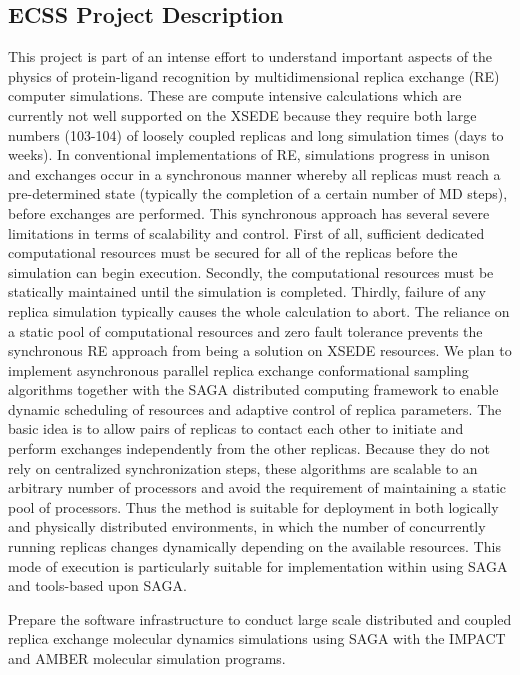\documentclass{sig-alternate}
\begin{document}
\subsection{ECSS Project Description}
 This project is
part of an intense eﬀort to understand important aspects of the
physics of protein-ligand recognition by multidimensional replica
exchange (RE) computer simulations. These are compute intensive
calculations which are currently not well supported on the XSEDE
because they require both large numbers (103-104) of loosely coupled
replicas and long simulation times (days to weeks). In conventional
implementations of RE, simulations progress in unison and exchanges
occur in a synchronous manner whereby all replicas must reach a
pre-determined state (typically the completion of a certain number of
MD steps), before exchanges are performed. This synchronous approach
has several severe limitations in terms of scalability and
control. First of all, suﬃcient dedicated computational resources must
be secured for all of the replicas before the simulation can begin
execution. Secondly, the computational resources must be statically
maintained until the simulation is completed. Thirdly, failure of any
replica simulation typically causes the whole calculation to abort.
The reliance on a static pool of computational resources and zero
fault tolerance prevents the synchronous RE approach from being a
solution on XSEDE resources. We plan to implement asynchronous
parallel replica exchange conformational sampling algorithms together
with the SAGA distributed computing framework to enable dynamic
scheduling of resources and adaptive control of replica
parameters. The basic idea is to allow pairs of replicas to contact
each other to initiate and perform exchanges independently from the
other replicas.  Because they do not rely on centralized
synchronization steps, these algorithms are scalable to an arbitrary
number of processors and avoid the requirement of maintaining a static
pool of processors. Thus the method is suitable for deployment in both
logically and physically distributed environments, in which the number
of concurrently running replicas changes dynamically depending on the
available resources. This mode of execution is particularly suitable
for implementation within using SAGA and tools-based upon SAGA.

Prepare the software infrastructure to conduct large scale distributed and
coupled replica exchange molecular dynamics simulations using SAGA with the
IMPACT and AMBER molecular simulation programs.
\end{document}
